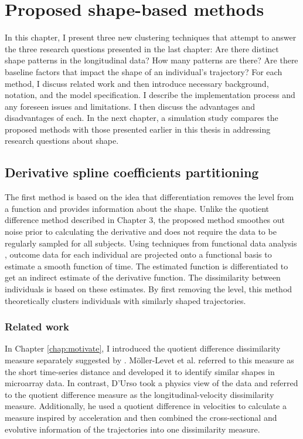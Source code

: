 \chapter{Proposed shape-based methods}
\label{chap:methods}
In this chapter, I present three new clustering techniques that attempt to answer the three research questions presented in the last chapter: Are there distinct shape patterns in the longitudinal data? How many patterns are there? Are there baseline factors that impact the shape of an individual's trajectory? For each method, I discuss related work and then introduce necessary background, notation, and the model specification. I describe the implementation process and any foreseen issues and limitations. I then discuss the advantages and disadvantages of each. In the next chapter, a simulation study compares the proposed methods with those presented earlier in this thesis in addressing research questions about shape.

\section{Derivative spline coefficients partitioning}
The first method is based on the idea that differentiation removes the level from a function and provides information about the shape. Unlike the quotient difference method described in Chapter 3,  the proposed method smoothes out noise prior to calculating the derivative and does not require the data to be regularly sampled for all subjects. Using techniques from functional data analysis \cite{ramsay2002}, outcome data for each individual are projected onto a functional basis to estimate a smooth function of time. The estimated function is differentiated to get an indirect estimate of the derivative function. The dissimilarity between individuals is based on these estimates. By first removing the level, this  method theoretically clusters individuals with similarly shaped trajectories.

\subsection{Related work}
In Chapter \ref{chap:motivate}, I introduced the quotient difference dissimilarity measure separately suggested by \textcite{d2000,moller2003}. M{\"o}ller-Levet et al. referred to this measure as the short time-series distance and developed it to identify similar shapes in microarray data. In contrast, D'Urso took a physics view of the data and referred to the quotient difference measure as the longitudinal-velocity dissimilarity measure. Additionally, he used a quotient difference in velocities to calculate a measure inspired by acceleration and then combined the cross-sectional and evolutive information of the trajectories into one dissimilarity measure.

